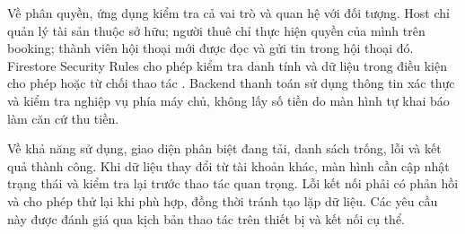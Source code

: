 Về phân quyền, ứng dụng kiểm tra cả vai trò và quan hệ với đối tượng. Host chỉ quản lý tài sản thuộc sở hữu; người thuê chỉ thực hiện quyền của mình trên booking; thành viên hội thoại mới được đọc và gửi tin trong hội thoại đó. Firestore Security Rules cho phép kiểm tra danh tính và dữ liệu trong điều kiện cho phép hoặc từ chối thao tác \parencite{firebase_rules_conditions}. Backend thanh toán sử dụng thông tin xác thực và kiểm tra nghiệp vụ phía máy chủ, không lấy số tiền do màn hình tự khai báo làm căn cứ thu tiền.

Về khả năng sử dụng, giao diện phân biệt đang tải, danh sách trống, lỗi và kết quả thành công. Khi dữ liệu thay đổi từ tài khoản khác, màn hình cần cập nhật trạng thái và kiểm tra lại trước thao tác quan trọng. Lỗi kết nối phải có phản hồi và cho phép thử lại khi phù hợp, đồng thời tránh tạo lặp dữ liệu. Các yêu cầu này được đánh giá qua kịch bản thao tác trên thiết bị và kết nối cụ thể.

